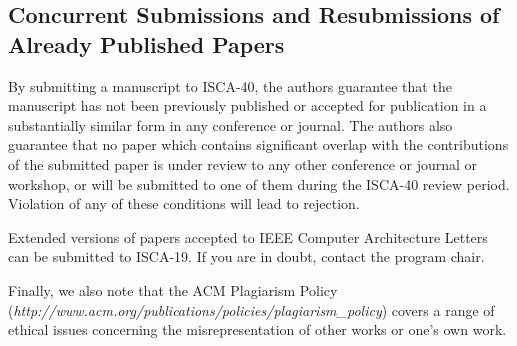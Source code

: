 \subsection{Concurrent Submissions and Resubmissions of Already Published Papers}

By submitting a manuscript to ISCA-40, the authors guarantee that the
manuscript has not been previously published or accepted for publication in a
substantially similar form in any conference or journal. The authors also
guarantee that no paper which contains significant overlap with the
contributions of the submitted paper is under review to any other conference or
journal or workshop, or will be submitted to one of them during the ISCA-40
review period. Violation of any of these conditions will lead to rejection.

Extended versions of papers accepted to IEEE Computer Architecture Letters can
be submitted to ISCA-19.  If you are in doubt, contact the program chair.

Finally, we also note that the ACM Plagiarism Policy ({\em http://www.acm.org/publications/policies/plagiarism\_policy}) covers a range of ethical issues concerning the misrepresentation of other works or one's own work.
